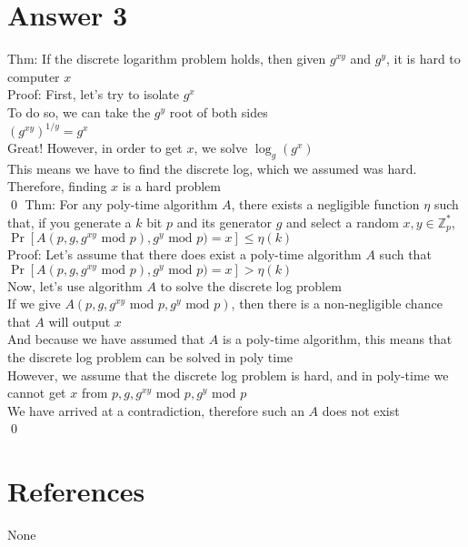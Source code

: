 \documentclass[11pt]{article}
\theoremstyle{definition}
\begin{document}
\section*{Answer 3}
Thm: If the discrete logarithm problem holds, then given $g^{xy}$ and $g^{y}$, it is hard to computer $x$\\
\newline
Proof: First, let's try to isolate $g^x$\\
To do so, we can take the $g^y$ root of both sides\\
$(g^{xy})^{1/y} = g^x$\\
Great! However, in order to get $x$, we solve $\log_g(g^x)$\\
This means we have to find the discrete log, which we assumed was hard.  Therefore, finding $x$ is a hard problem\\
\qed
\newline
Thm: For any poly-time algorithm $A$, there exists a negligible function $\eta$ such that, if you generate a $k$ bit $p$ and its generator $g$ and select a random $x,y \in \mathbb{Z}_p^*$, $\Pr[A(p,g,g^{xy} \text { mod } p), g^y \text{ mod } p) = x] \le \eta(k)$\\
\newline
Proof: Let's assume that there does exist a poly-time algorithm $A$ such that $\Pr[A(p,g,g^{xy} \text { mod } p), g^y \text{ mod } p) = x] > \eta(k)$\\
Now, let's use algorithm $A$ to solve the discrete log problem\\
If we give $A(p, g, g^{xy} \text { mod } p, g^y \text{ mod } p)$, then there is a non-negligible chance that $A$ will output $x$\\
And because we have assumed that $A$ is a poly-time algorithm, this means that the discrete log problem can be solved in poly time\\
However, we assume that the discrete log problem is hard, and in poly-time we cannot get $x$ from $p, g, g^{xy} \text{ mod } p, g^y \text{ mod } p$\\
We have arrived at a contradiction, therefore such an $A$ does not exist\\
\qed


\noindent\hrulefill


\section*{References}

None
\end{document}
